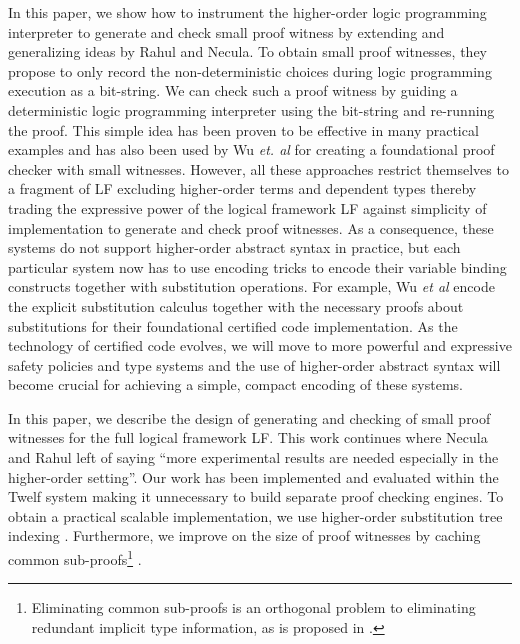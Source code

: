 \documentclass{llncs}
\begin{document}
In this paper, we show how to instrument the higher-order logic
programming interpreter to generate and check small proof
witness by extending and generalizing ideas by Rahul and
Necula\cite{Necula+01:oracle}. To obtain small proof witnesses, they
propose to only record the non-deterministic choices during 
logic programming execution as a bit-string. We can check such a proof
witness by guiding a deterministic logic programming interpreter using the
bit-string and re-running the proof. This simple idea has
been proven to be effective in many practical examples and has also
been used by Wu {\em{et. al}} \cite{Appel:PPDP03} for creating a
foundational proof checker with small witnesses. However, all these
approaches restrict themselves to a fragment of LF excluding
higher-order terms and dependent types thereby trading the expressive
power of the logical framework LF against simplicity of implementation
to generate and check proof witnesses.  
As a consequence, these systems do not support higher-order abstract
syntax in practice, but each particular system now has to use
encoding tricks to encode their variable binding constructs together
with substitution operations. For example, Wu {\em et
  al}\cite{Appel:PPDP03} encode the explicit  substitution calculus
\cite{Abadi:POPL90} together with the necessary proofs about
substitutions for their foundational certified code implementation. As
the technology of certified code evolves, we will move to more
powerful and expressive safety policies and type systems and the use
of higher-order abstract syntax will become crucial for achieving a 
simple, compact encoding of these systems.


In this paper, we describe the design of generating and checking
of small proof witnesses for the full logical framework LF. This work
continues where Necula and Rahul \cite{Necula+01:oracle} left of 
saying ``more experimental results are needed especially in the
higher-order setting''. Our work has been implemented and evaluated
within the Twelf system \cite{Pfenning99cade} making it unnecessary to
build separate proof checking engines. To obtain a practical scalable
implementation, we use higher-order substitution tree  indexing
\cite{Pientka:ICLP03}. Furthermore, we improve on the size of proof
witnesses by caching common sub-proofs\footnote{Eliminating
  common sub-proofs is an orthogonal problem to eliminating redundant
  implicit type information, as is proposed in \cite{Necula98lics}.}
. 
\end{document}
